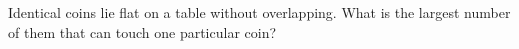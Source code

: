 Identical coins lie flat on a table without overlapping. What is the largest number of them that can touch one particular coin?
